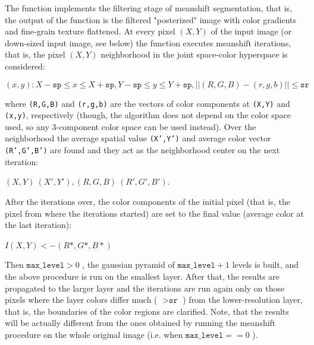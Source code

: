 \begin{description}
\end{description}

The function implements the filtering
stage of meanshift segmentation, that is, the output of the function is
the filtered "posterized" image with color gradients and fine-grain
texture flattened. At every pixel $(X,Y)$ of the input image (or
down-sized input image, see below) the function executes meanshift
iterations, that is, the pixel $(X,Y)$ neighborhood in the joint
space-color hyperspace is considered:

\[
(x,y): X-\texttt{sp} \le x \le X+\texttt{sp} , Y-\texttt{sp} \le y \le Y+\texttt{sp} , ||(R,G,B)-(r,g,b)||  \le  \texttt{sr}
\]

where \texttt{(R,G,B)} and \texttt{(r,g,b)} are the vectors of color components at \texttt{(X,Y)} and \texttt{(x,y)}, respectively (though, the algorithm does not depend on the color space used, so any 3-component color space can be used instead). Over the neighborhood the average spatial value \texttt{(X',Y')} and average color vector \texttt{(R',G',B')} are found and they act as the neighborhood center on the next iteration: 

$(X,Y)~(X',Y'), (R,G,B)~(R',G',B').$

After the iterations over, the color components of the initial pixel (that is, the pixel from where the iterations started) are set to the final value (average color at the last iteration): 

$I(X,Y) <- (R*,G*,B*)$

Then $\texttt{max\_level}>0$ , the gaussian pyramid of
$\texttt{max\_level}+1$ levels is built, and the above procedure is run
on the smallest layer. After that, the results are propagated to the
larger layer and the iterations are run again only on those pixels where
the layer colors differ much ( $>\texttt{sr}$ ) from the lower-resolution
layer, that is, the boundaries of the color regions are clarified. Note,
that the results will be actually different from the ones obtained by
running the meanshift procedure on the whole original image (i.e. when
$\texttt{max\_level}==0$ ).

